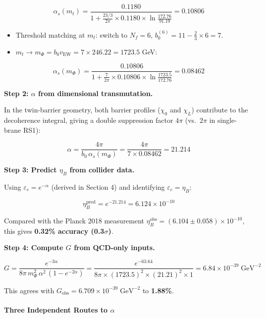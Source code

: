 \documentclass[
  11pt,
]{article}
\begin{document}
\[\alpha_s(m_t) = \frac{0.1180}{1 + \frac{23/3}{2\pi}\times 0.1180 \times \ln\frac{172.76}{91.19}} = 0.10806 \tag{146}\]

\begin{itemize}
\item
  Threshold matching at \(m_t\): switch to \(N_f = 6\),
  \(b_0^{(6)} = 11 - \tfrac{2}{3}\times 6 = 7\).
\item
  \(m_t \to m_\Phi = b_0 v_\text{EW} = 7 \times 246.22 = 1723.5\) GeV:
\end{itemize}

\[\alpha_s(m_\Phi) = \frac{0.10806}{1 + \frac{7}{2\pi}\times 0.10806 \times \ln\frac{1723.5}{172.76}} = 0.08462 \tag{147}\]

\textbf{Step 2: \(\alpha\) from dimensional transmutation.}

In the twin-barrier geometry, both barrier profiles (\(\chi_0\) and
\(\chi_L\)) contribute to the decoherence integral, giving a double
suppression factor \(4\pi\) (vs.~\(2\pi\) in single-brane RS1):

\[\alpha = \frac{4\pi}{b_0 \, \alpha_s(m_\Phi)} = \frac{4\pi}{7 \times 0.08462} = 21.214 \tag{148}\]

\textbf{Step 3: Predict \(\eta_B\) from collider data.}

Using \(\varepsilon_c = e^{-\alpha}\) (derived in Section 4) and
identifying \(\varepsilon_c = \eta_B\):

\[\eta_B^\text{pred} = e^{-21.214} = 6.124 \times 10^{-10} \tag{149}\]

Compared with the Planck 2018 measurement
\(\eta_B^\text{obs} = (6.104 \pm 0.058) \times 10^{-10}\), this gives
\textbf{0.32\% accuracy (0.3\(\sigma\))}.

\textbf{Step 4: Compute \(G\) from QCD-only inputs.}

\[G = \frac{e^{-3\alpha}}{8\pi\,m_\Phi^2\,\alpha^2\,(1 - e^{-2\alpha})} = \frac{e^{-63.64}}{8\pi \times (1723.5)^2 \times (21.21)^2 \times 1} = 6.84 \times 10^{-39}\;\text{GeV}^{-2} \tag{150}\]

This agrees with
\(G_\text{obs} = 6.709 \times 10^{-39}\;\text{GeV}^{-2}\) to
\textbf{1.88\%}.

\bigskip

\hypertarget{three-independent-routes-to-alpha}{%
\paragraph{\texorpdfstring{Three Independent Routes to
\(\alpha\)}{Three Independent Routes to \textbackslash alpha}}\label{three-independent-routes-to-alpha}}
\end{document}
